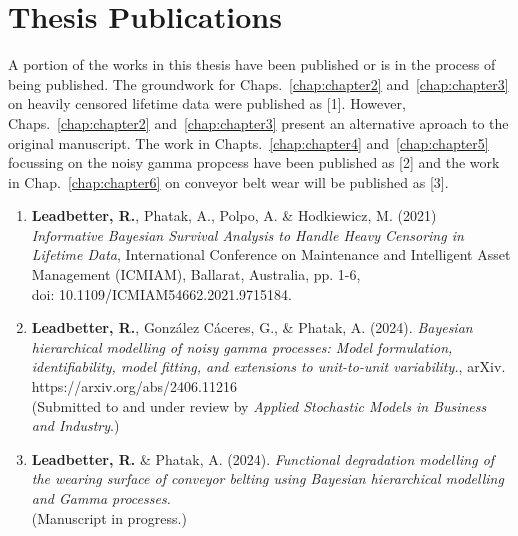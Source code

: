 
\chapter*{Thesis Publications}  \label{chap:publications}

A portion of the works in this thesis have been published or is in the process of being published. The groundwork for Chaps.~\ref{chap:chapter2} and~\ref{chap:chapter3} on heavily censored lifetime data were published as \citet{leadbetter2021}[1]. However, Chaps.~\ref{chap:chapter2} and~\ref{chap:chapter3} present an alternative aproach to the original manuscript. The work in Chapts.~\ref{chap:chapter4} and~\ref{chap:chapter5} focussing on the noisy gamma propcess have been published as \citet{leadbetter2024}[2] and the work in Chap.~\ref{chap:chapter6} on conveyor belt wear will be published as \citet{leadbetter2025}[3].

\begin{enumerate}
  \item \textbf{Leadbetter, R.}, Phatak, A., Polpo, A. \& Hodkiewicz, M. (2021) \textit{Informative Bayesian Survival Analysis to Handle Heavy Censoring in Lifetime Data}, International Conference on Maintenance and Intelligent Asset Management (ICMIAM), Ballarat, Australia, pp. 1-6,\\ doi: 10.1109/ICMIAM54662.2021.9715184.
  \item \textbf{Leadbetter, R.}, Gonz\'{a}lez C\'{a}ceres, G., \& Phatak, A. (2024). \textit{Bayesian hierarchical modelling of noisy gamma processes: Model formulation, identifiability, model fitting, and extensions to unit-to-unit variability.}, arXiv. https://arxiv.org/abs/2406.11216 \\
  (Submitted to and under review by \textit{Applied Stochastic Models in Business and Industry}.)
  \item \textbf{Leadbetter, R.} \& Phatak, A. (2024). \textit{Functional degradation modelling of the wearing surface of conveyor belting using Bayesian hierarchical modelling and Gamma processes.} \\
  (Manuscript in progress.)
\end{enumerate}